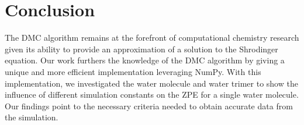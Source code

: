\documentclass[journal=jacsat,manuscript=article]{achemso}
\begin{document}
\section{Conclusion}
The DMC algorithm remains at the forefront of computational chemistry research given its ability to provide an approximation of a solution to the Shrodinger equation. Our work furthers the knowledge of the DMC algorithm by giving a unique and more efficient implementation leveraging NumPy. With this implementation, we investigated the water molecule and water trimer to show the influence of different simulation constants on the ZPE for a single water molecule. Our findings point to the necessary criteria needed to obtain accurate data from the simulation. 
%
%
%
%
\end{document}
